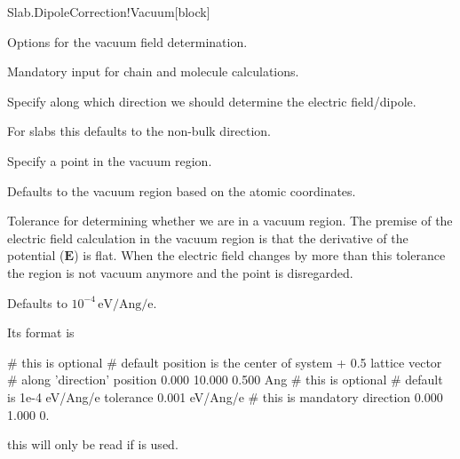   \begin{fdfentry}{Slab.DipoleCorrection!Vacuum}[block]
  
    Options for the vacuum field determination.
  
    \begin{fdfoptions}
  
      \option[direction]%
  
      Mandatory input for chain and molecule calculations.
  
      Specify along which direction we should determine the electric
      field/dipole.
  
      For slabs this defaults to the non-bulk direction.
  
      \option[position]%
  
      Specify a point in the vacuum region.
  
      Defaults to the vacuum region based on the atomic coordinates.
  
      \option[tolerance]%
  
      Tolerance for determining whether we are in a vacuum region.
      The premise of the electric field calculation in the vacuum region
      is that the derivative of the potential ($\mathbf E$) is
      flat. When the electric field changes by more than this tolerance
      the region is not vacuum anymore and the point is disregarded.
  
      Defaults to $10^{-4}\,\mathrm{eV/Ang/e}$.
  
    \end{fdfoptions}
  
    Its format is
    \begin{fdfexample}
          # this is optional
          # default position is the center of system + 0.5 lattice vector
          # along 'direction'
          position 0.000  10.000  0.500  Ang
          # this is optional
          # default is 1e-4 eV/Ang/e
          tolerance 0.001 eV/Ang/e
          # this is mandatory
          direction 0.000  1.000  0.
    \end{fdfexample}
  
    \note this will only be read if  is used.
  
  \end{fdfentry}
  
